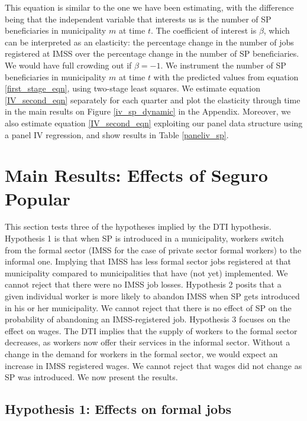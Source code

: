 \documentclass[oneside,11pt]{article}
\begin{document}
\noindent This equation is similar to the one we have been estimating, with the difference being that the independent variable that interests us is the number of SP beneficiaries in municipality $m$ at time $t$. The coefficient of interest is $\beta$, which can be interpreted as an elasticity: the percentage change in the number of jobs registered at IMSS over the percentage change in the number of SP beneficiaries. We would have full crowding out if $\beta=-1$. We instrument the number of SP beneficiaries in municipality $m$ at time $t$ with the predicted values from equation \ref{first_stage_eqn}, using two-stage least squares. We estimate equation \ref{IV_second_eqn} separately for each quarter and plot the elasticity through time in the main results on Figure \ref{iv_sp_dynamic} in the Appendix. 
Moreover, we also estimate equation \ref{IV_second_eqn} exploiting our panel data structure using a panel IV regression, and show results in Table \ref{paneliv_sp}.


\vspace{.2in}
\section{Main Results: Effects of Seguro Popular} \label{effects}

This section tests three of the hypotheses implied by the DTI hypothesis. Hypothesis 1 is that when SP is introduced in a municipality, workers switch from the formal sector (IMSS for the case of private sector formal workers) to the informal one. Implying that IMSS has less formal sector jobs registered at that municipality compared to municipalities that have (not yet) implemented. We cannot reject that there were no IMSS job losses. Hypothesis 2 posits that a given individual worker is more likely to abandon IMSS when SP gets introduced in his or her municipality. We cannot reject that there is no effect of SP on the probability of abandoning an IMSS-registered job. Hypothesis 3 focuses on the effect on wages. The DTI implies that the supply of workers to the formal sector decreases, as workers now offer their services in the informal sector. Without a change in the demand for workers in the formal sector, we would expect an increase in IMSS registered wages. We cannot reject that wages did not change as SP was introduced. We now present the results.

\subsection{Hypothesis 1: Effects on formal jobs}
\end{document}
